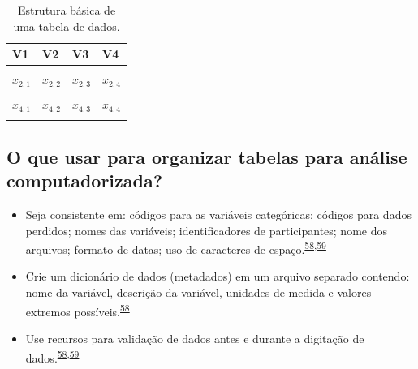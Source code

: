 \documentclass[
]{book}
\begin{document}
\begin{table}

\caption{\label{tab:tabela-0}Estrutura básica de uma tabela de dados.}
\centering
\begin{tabu} to 
\toprule
\textbf{V1} & \textbf{V2} & \textbf{V3} & \textbf{V4}\\
\midrule
{} &  &  & \\
$x_{2,1}$ & $x_{2,2}$ & $x_{2,3}$ & $x_{2,4}$\\
 &  &  & \\
$x_{4,1}$ & $x_{4,2}$ & $x_{4,3}$ & $x_{4,4}$\\
 &  &  & \\
\bottomrule
\end{tabu}
\end{table}

\hypertarget{o-que-usar-para-organizar-tabelas-para-anuxe1lise-computadorizada}{%
\subsection{O que usar para organizar tabelas para análise computadorizada?}\label{o-que-usar-para-organizar-tabelas-para-anuxe1lise-computadorizada}}

\begin{itemize}
\item
  Seja consistente em: códigos para as variáveis categóricas; códigos para dados perdidos; nomes das variáveis; identificadores de participantes; nome dos arquivos; formato de datas; uso de caracteres de espaço.\textsuperscript{\protect\hyperlink{ref-broman2018}{58},\protect\hyperlink{ref-Juluru2015}{59}}
\item
  Crie um dicionário de dados (metadados) em um arquivo separado contendo: nome da variável, descrição da variável, unidades de medida e valores extremos possíveis.\textsuperscript{\protect\hyperlink{ref-broman2018}{58}}
\item
  Use recursos para validação de dados antes e durante a digitação de dados.\textsuperscript{\protect\hyperlink{ref-broman2018}{58},\protect\hyperlink{ref-Juluru2015}{59}}
\end{itemize}
\end{document}
